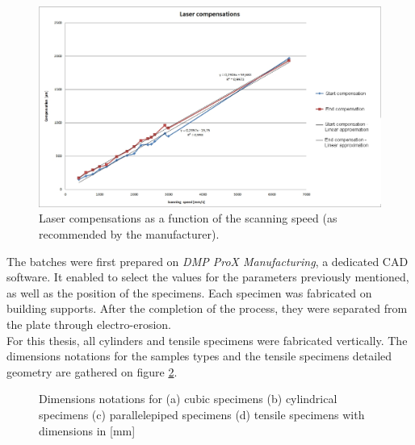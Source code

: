 \begin{figure}[ht]
\centering
\includegraphics[scale=0.45]{Images/Compens1}
\decoRule
\caption[Laser compensations as a function of the scanning speed (as recommended by the manufacturer)]{Laser compensations as a function of the scanning speed (as recommended by the manufacturer).}
\label{fig:Compens1}
\end{figure}

The batches were first prepared on \textit{DMP ProX Manufacturing}, a dedicated CAD software. It enabled to select the values for the parameters previously mentioned, as well as the position of the specimens. Each specimen was fabricated on building supports. After the completion of the process, they were separated from the plate through electro-erosion. \\

For this thesis, all cylinders and tensile specimens were fabricated vertically. The dimensions notations for the samples types and the tensile specimens detailed geometry are gathered on figure \ref{fig:cc}.\\

\begin{figure}[ht]
\centering
\noindent{}
\decoRule
\caption[Dimensions notations for (a) cubic specimens (b) cylindrical specimens (c) parallelepiped specimens (d) tensile specimen]{Dimensions notations for (a) cubic specimens (b) cylindrical specimens (c) parallelepiped specimens (d) tensile specimens with dimensions in [mm]}
\label{fig:cc}
\end{figure}


